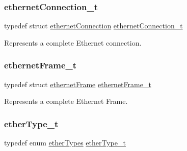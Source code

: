 \mbox{\label{group__ethernet_gae7b6008a02816680c2e3a1e3d2451a60}} 
\subsubsection{\texorpdfstring{ethernetConnection\_t}{ethernetConnection\_t}}
{\footnotesize\ttfamily typedef struct \mbox{\hyperlink{structethernet_connection}{ethernet\+Connection}}  \mbox{\hyperlink{group__ethernet_gae7b6008a02816680c2e3a1e3d2451a60}{ethernet\+Connection\+\_\+t}}}



Represents a complete Ethernet connection. 

\mbox{\label{group__ethernet_ga7519a7ae14b490659069435698d28a25}} 
\subsubsection{\texorpdfstring{ethernetFrame\_t}{ethernetFrame\_t}}
{\footnotesize\ttfamily typedef struct \mbox{\hyperlink{structethernet_frame}{ethernet\+Frame}}  \mbox{\hyperlink{group__ethernet_ga7519a7ae14b490659069435698d28a25}{ethernet\+Frame\+\_\+t}}}



Represents a complete Ethernet Frame. 

\mbox{\label{group__ethernet_ga467703afefdcaf7893a7da3eb63280ed}} 
\subsubsection{\texorpdfstring{etherType\_t}{etherType\_t}}
{\footnotesize\ttfamily typedef enum \mbox{\hyperlink{group__ethernet_gae9b220b061a72fe29cc1e3913a1f73cb}{ether\+Types}}  \mbox{\hyperlink{group__ethernet_ga467703afefdcaf7893a7da3eb63280ed}{ether\+Type\+\_\+t}}}

\mbox{\label{group__ethernet_ga0e02d2c1291711df8a3ffc6f5c8aab98}} 
